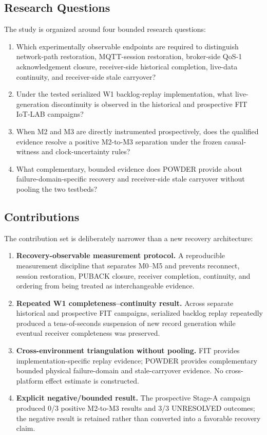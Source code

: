 \documentclass[journal]{IEEEtran}
\begin{document}
\subsection{Research Questions}
The study is organized around four bounded research questions:
\begin{enumerate}
    \item[\textbf{RQ1}] Which experimentally observable endpoints are required to distinguish network-path restoration, MQTT-session restoration, broker-side QoS-1 acknowledgement closure, receiver-side historical completion, live-data continuity, and receiver-side stale carryover?
    \item[\textbf{RQ2}] Under the tested serialized W1 backlog-replay implementation, what live-generation discontinuity is observed in the historical and prospective FIT IoT-LAB campaigns?
    \item[\textbf{RQ3}] When M2 and M3 are directly instrumented prospectively, does the qualified evidence resolve a positive M2-to-M3 separation under the frozen causal-witness and clock-uncertainty rules?
    \item[\textbf{RQ4}] What complementary, bounded evidence does POWDER provide about failure-domain-specific recovery and receiver-side stale carryover without pooling the two testbeds?
\end{enumerate}

\subsection{Contributions}
The contribution set is deliberately narrower than a new recovery architecture:
\begin{enumerate}
    \item[\textbf{A1}] \textbf{Recovery-observable measurement protocol.} A reproducible measurement discipline that separates M0--M5 and prevents reconnect, session restoration, PUBACK closure, receiver completion, continuity, and ordering from being treated as interchangeable evidence.
    \item[\textbf{A2}] \textbf{Repeated W1 completeness--continuity result.} Across separate historical and prospective FIT campaigns, serialized backlog replay repeatedly produced a tens-of-seconds suspension of new record generation while eventual receiver completeness was preserved.
    \item[\textbf{A3}] \textbf{Cross-environment triangulation without pooling.} FIT provides implementation-specific replay evidence; POWDER provides complementary bounded physical failure-domain and stale-carryover evidence. No cross-platform effect estimate is constructed.
    \item[\textbf{A4}] \textbf{Explicit negative/bounded result.} The prospective Stage-A campaign produced 0/3 positive M2-to-M3 results and 3/3 UNRESOLVED outcomes; the negative result is retained rather than converted into a favorable recovery claim.
\end{enumerate}
\end{document}
